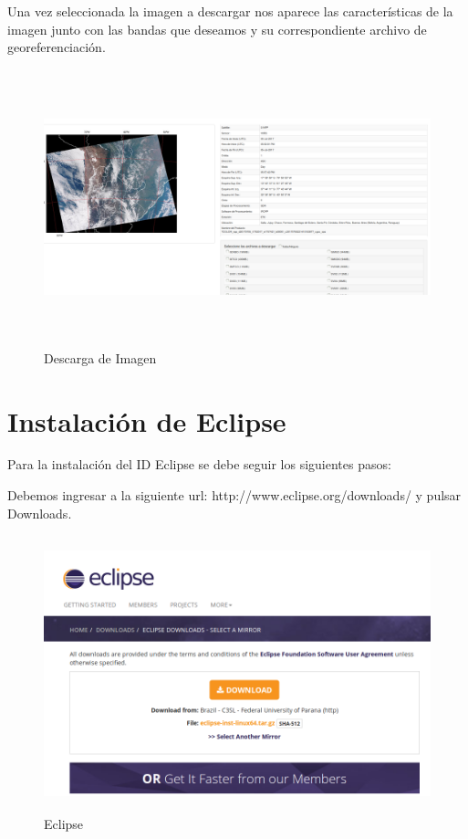 Una vez seleccionada la imagen a descargar nos aparece las características de la imagen junto con las bandas que deseamos y su correspondiente archivo de georeferenciación.
\begin{figure}[H]
 \centering
  \includegraphics[height=8cm,keepaspectratio=true,clip=true]{imagenes/Apendice/conaepag3.png}
  \caption{Descarga de Imagen}
\end{figure}
\section{Instalación de Eclipse}\label{sec:instalacionEclipse}
Para la instalación del ID Eclipse se debe seguir los siguientes pasos:

Debemos ingresar a la siguiente url: http://www.eclipse.org/downloads/ y pulsar Downloads.
\begin{figure}[H]
 \centering
  \includegraphics[height=8cm,keepaspectratio=true,clip=true]{imagenes/Apendice/eclipse1.png}
  \caption{Eclipse}
\end{figure}

